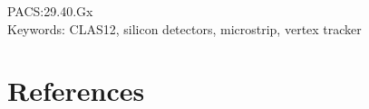 \documentclass[3p,times,twocolumn]{elsarticle}
\begin{document}
\begin{frontmatter}


\end{frontmatter}

PACS:29.40.Gx \\
Keywords: CLAS12, silicon detectors, microstrip, vertex tracker

\date{\today}











\section{References}



\end{document}
